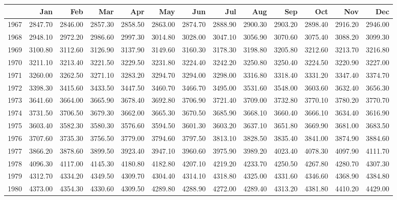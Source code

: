 \begin{longtable}{rrrrrrrrrrrrr}
  \hline
 & Jan & Feb & Mar & Apr & May & Jun & Jul & Aug & Sep & Oct & Nov & Dec \\ 
  \hline
1967 & 2847.70 & 2846.00 & 2857.30 & 2858.50 & 2863.00 & 2874.70 & 2888.90 & 2900.30 & 2903.20 & 2898.40 & 2916.20 & 2946.00 \\ 
  1968 & 2948.10 & 2972.20 & 2986.60 & 2997.30 & 3014.80 & 3028.00 & 3047.10 & 3056.90 & 3070.60 & 3075.40 & 3088.20 & 3099.30 \\ 
  1969 & 3100.80 & 3112.60 & 3126.90 & 3137.90 & 3149.60 & 3160.30 & 3178.30 & 3198.80 & 3205.80 & 3212.60 & 3213.70 & 3216.80 \\ 
  1970 & 3211.10 & 3213.40 & 3221.50 & 3229.50 & 3231.80 & 3224.40 & 3242.20 & 3250.80 & 3250.40 & 3224.50 & 3220.90 & 3227.00 \\ 
  1971 & 3260.00 & 3262.50 & 3271.10 & 3283.20 & 3294.70 & 3294.00 & 3298.00 & 3316.80 & 3318.40 & 3331.20 & 3347.40 & 3374.70 \\ 
  1972 & 3398.30 & 3415.60 & 3433.50 & 3447.50 & 3460.70 & 3466.70 & 3495.00 & 3531.60 & 3548.00 & 3603.60 & 3632.40 & 3656.30 \\ 
  1973 & 3641.60 & 3664.00 & 3665.90 & 3678.40 & 3692.80 & 3706.90 & 3721.40 & 3709.00 & 3732.80 & 3770.10 & 3780.20 & 3770.70 \\ 
  1974 & 3731.50 & 3706.50 & 3679.30 & 3662.00 & 3665.30 & 3670.50 & 3685.90 & 3668.10 & 3660.40 & 3666.10 & 3634.40 & 3616.90 \\ 
  1975 & 3603.40 & 3582.30 & 3580.30 & 3576.60 & 3594.50 & 3601.30 & 3603.20 & 3637.10 & 3651.80 & 3669.90 & 3681.00 & 3683.50 \\ 
  1976 & 3707.60 & 3735.30 & 3756.50 & 3779.00 & 3794.60 & 3797.50 & 3813.10 & 3828.50 & 3835.40 & 3841.00 & 3874.90 & 3884.60 \\ 
  1977 & 3866.20 & 3878.60 & 3899.50 & 3923.40 & 3947.10 & 3960.60 & 3975.90 & 3989.20 & 4023.40 & 4078.30 & 4097.90 & 4111.70 \\ 
  1978 & 4096.30 & 4117.00 & 4145.30 & 4180.80 & 4182.80 & 4207.10 & 4219.20 & 4233.70 & 4250.50 & 4267.80 & 4280.70 & 4307.30 \\ 
  1979 & 4312.70 & 4334.20 & 4349.50 & 4309.70 & 4304.40 & 4314.10 & 4318.80 & 4325.00 & 4331.60 & 4346.60 & 4368.90 & 4384.80 \\ 
  1980 & 4373.00 & 4354.30 & 4330.60 & 4309.50 & 4289.80 & 4288.90 & 4272.00 & 4289.40 & 4313.20 & 4381.80 & 4410.20 & 4429.00 \\ 

\end{longtable}
